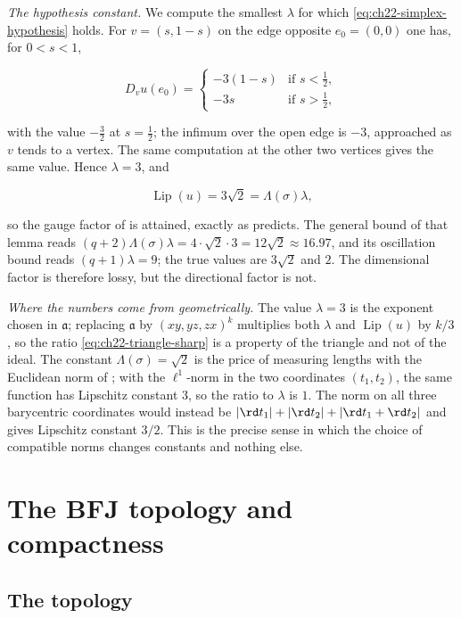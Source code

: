 \begin{example}
\emph{The hypothesis constant.}  We compute the smallest $\lambda$ for
which \eqref{eq:ch22-simplex-hypothesis} holds.  For $v=(s,1-s)$ on the
edge opposite $e_0=(0,0)$ one has, for $0<s<1$,

\[
 D_vu(e_0)=
 \begin{cases}
  -3(1-s)&\text{if }s<\tfrac12,\\
  -3s&\text{if }s>\tfrac12,
 \end{cases}
\]

with the value $-\tfrac32$ at $s=\tfrac12$; the infimum over the open
edge is $-3$, approached as $v$ tends to a vertex.  The same computation
at the other two vertices gives the same value.  Hence
$\lambda=3$, and

\[
 \operatorname{Lip}(u)=3\sqrt2=\Lambda(\sigma)\lambda ,
\tag{22.62}\label{eq:ch22-triangle-sharp}
\]

so the gauge factor of  is attained, exactly as
 predicts.  The general bound of that lemma
reads $(q+2)\Lambda(\sigma)\lambda=4\cdot\sqrt2\cdot3=12\sqrt2\approx16.97$,
and its oscillation bound reads $(q+1)\lambda=9$; the true values are
$3\sqrt2$ and $2$.  The dimensional factor is therefore lossy, but the
directional factor is not.

\emph{Where the numbers come from geometrically.}  The value $\lambda=3$
is the exponent chosen in $\mathfrak a$; replacing
$\mathfrak a$ by $(xy,yz,zx)^k$ multiplies both $\lambda$ and
$\operatorname{Lip}(u)$ by $k/3$, so the ratio
\eqref{eq:ch22-triangle-sharp} is a property of the triangle and not of the
ideal.  The constant $\Lambda(\sigma)=\sqrt2$ is the price of measuring
lengths with the Euclidean norm of
; with the $\ell^1$-norm in the two
coordinates $(t_1,t_2)$, the same function has Lipschitz constant $3$,
so the ratio to $\lambda$ is $1$.  The norm on all three barycentric
coordinates would instead be $|\rd t_1|+|\rd t_2|+|\rd t_1+\rd t_2|$
and gives Lipschitz constant $3/2$.  This is the
precise sense in which the choice of compatible norms changes constants and
nothing else.
\end{example}

\section{The BFJ topology and compactness}
\label{sec:ch22-topology}

\subsection{The topology}

